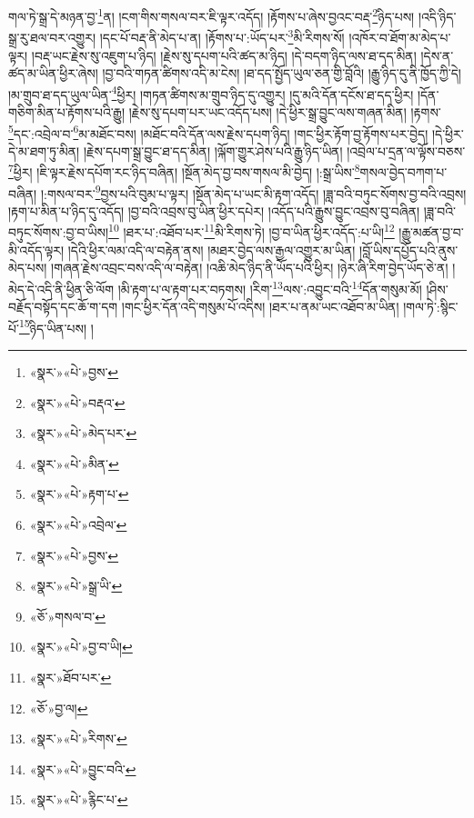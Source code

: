 གལ་ཏེ་སྒྲ་དེ་མཉན་བྱ་\footnote{«སྣར་»«པེ་»བྱས་}ན། །ངག་གིས་གསལ་བར་ཇི་ལྟར་འདོད། །རྟོགས་པ་ཞེས་བྱའང་བརྡ་\footnote{«སྣར་»«པེ་»བརྡའ་}ཉིད་པས། །འདི་ཉིད་སྒྲ་རུ་ཐལ་བར་འགྱུར། །དང་པོ་བརྡ་ནི་མེད་པ་ན། །རྟོགས་པ་:ཡོད་པར་\footnote{«སྣར་»«པེ་»མེད་པར་}མི་རིགས་སོ། །འཁོར་བ་ཐོག་མ་མེད་པ་ལྟར། །བརྡ་ཡང་རྗེས་སུ་འཇུག་པ་ཉིད། །རྗེས་སུ་དཔག་པའི་ཚད་མ་ཉིད། །དེ་བདག་ཉིད་ལས་ཐ་དད་མིན། །དེས་ན་ཚད་མ་ཡིན་ཕྱིར་ཞེས། །བྱ་བའི་གཏན་ཚིགས་འདི་མ་ངེས། །ཐ་དད་སྤྱོད་ཡུལ་ཅན་གྱི་བློའི། །རྒྱུ་ཉིད་དུ་ནི་ཁྱོད་ཀྱི་དེ། །མ་གྲུབ་ཐ་དད་ཡུལ་ཡིན་\footnote{«སྣར་»«པེ་»མིན་}ཕྱིར། །གཏན་ཚིགས་མ་གྲུབ་ཉིད་དུ་འགྱུར། །དུ་མའི་དོན་དངོས་ཐ་དད་ཕྱིར། །དོན་གཅིག་མིན་པ་རྟོགས་པའི་རྒྱུ། །རྗེས་སུ་དཔག་པར་ཡང་འདོད་པས། །དེ་ཕྱིར་སྒྲ་བྱུང་ལས་གཞན་མིན། །རྟགས་\footnote{«སྣར་»«པེ་»རྟག་པ་}དང་:འབྲེལ་བ་\footnote{«སྣར་»«པེ་»འབྲེལ་}མ་མཐོང་བས། །མཐོང་བའི་དོན་ལས་རྗེས་དཔག་ཉིད། །གང་ཕྱིར་རྟོག་བྱ་རྟོགས་པར་བྱེད། །དེ་ཕྱིར་དེ་མ་ཐག་ཏུ་མིན། །རྗེས་དཔག་སྒྲ་བྱུང་ཐ་དད་མིན། །ལྐོག་གྱུར་ཤེས་པའི་རྒྱུ་ཉིད་ཡིན། །འབྲེལ་པ་དྲན་ལ་ལྟོས་བཅས་\footnote{«སྣར་»«པེ་»བྱས་}ཕྱིར། །ཇི་ལྟར་རྗེས་དཔོག་རང་ཉིད་བཞིན། །སྔོན་མེད་བྱ་བས་གསལ་མི་བྱེད། །:སྒྲ་ཡིས་\footnote{«སྣར་»«པེ་»སྒྲ་ཡི་}གསལ་བྱེད་བཀག་པ་བཞིན། །:གསལ་བར་\footnote{«ཅོ་»གསལ་བ་}བྱས་པའི་བུམ་པ་ལྟར། །སྔོན་མེད་པ་ཡང་མི་རྟག་འདོད། །ཟླ་བའི་བཏུང་སོགས་བྱ་བའི་འབྲས། །རྟག་པ་མིན་པ་ཉིད་དུ་འདོད། །བྱ་བའི་འབྲས་བུ་ཡིན་ཕྱིར་དཔེར། །འདོད་པའི་རྒྱུས་བྱུང་འབྲས་བུ་བཞིན། །ཟླ་བའི་བཏུང་སོགས་:བྱ་བ་ཡིས།\footnote{«སྣར་»«པེ་»བྱ་བ་ཡི།} །ཐར་པ་:འཐོབ་པར་\footnote{«སྣར་»ཐོབ་པར་}མི་རིགས་ཏེ། །བྱ་བ་ཡིན་ཕྱིར་འདོད་:པ་ཡི།\footnote{«ཅོ་»བྱ་ལ།} །རྒྱུ་མཚན་བྱ་བ་མི་འདོད་ལྟར། །དེའི་ཕྱིར་ལམ་འདི་ལ་བརྟེན་ནས། །མཐར་བྱེད་ལས་རྒྱལ་འགྱུར་མ་ཡིན། །བློ་ཡིས་དཔྱོད་པའི་ནུས་མེད་པས། །གཞན་རྗེས་འབྲང་བས་འདི་ལ་བརྟེན། །འཆི་མེད་ཉིད་ནི་ཡོད་པའི་ཕྱིར། །ཉེར་ཞི་རིག་བྱེད་ཡོད་ཅེ་ན། །མེད་དེ་འདི་ནི་ཕྱིན་ཅི་ལོག །མི་རྟག་པ་ལ་རྟག་པར་བཏགས། །རིག་\footnote{«སྣར་»«པེ་»རིགས་}ལས་:འབྱུང་བའི་\footnote{«སྣར་»«པེ་»བྱུང་བའི་}དོན་གསུམ་མོ། །ཤིས་བརྗོད་བསྟོད་དང་ཆོ་ག་དག །གང་ཕྱིར་དོན་འདི་གསུམ་པོ་འདིས། །ཐར་པ་ནམ་ཡང་འཐོབ་མ་ཡིན། །གལ་ཏེ་:སྙིང་པོ་\footnote{«སྣར་»«པེ་»རྙིང་པ་}ཉིད་ཡིན་པས། །
